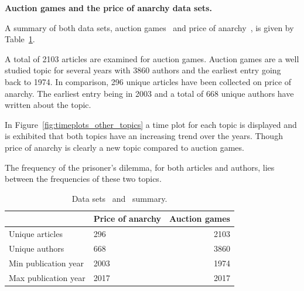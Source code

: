 \documentclass{article}
\begin{document}
\textbf{Auction games and the price of anarchy data sets.}

A summary of both data sets, auction games~\cite{} and price of anarchy~\cite{},
is given by Table~\ref{table:summary_other_topics}.

A total of 2103 articles are examined for auction games. Auction games are a well
studied topic for several years with 3860 authors and the earliest entry going
back to 1974. In comparison, 296 unique articles have been collected on price of
anarchy. The earliest entry being in 2003 and a total of 668 unique authors have
written about the topic.

In Figure~\ref{fig:timeplots_other_topics} a time plot for each topic is
displayed and is exhibited that both topics have an increasing trend over
the years. Though price of anarchy is clearly a new topic compared to auction games.

The frequency of the prisoner's dilemma, for both articles and authors, lies
between the frequencies of these two topics.

\begin{table}[!hbtp]
    \begin{center}
    \begin{tabular}{llr}
        \toprule
         &            Price of anarchy &  Auction games \\
        \midrule
        Unique articles      & 296  & 2103 \\
        Unique authors       & 668  & 3860 \\
        Min publication year & 2003 & 1974 \\
        Max publication year & 2017 & 2017 \\
        \bottomrule
    \end{tabular}
    \end{center}
    \caption{Data sets~\cite{} and~\cite{} summary.}
    \label{table:summary_other_topics}
\end{table}
\end{document}
